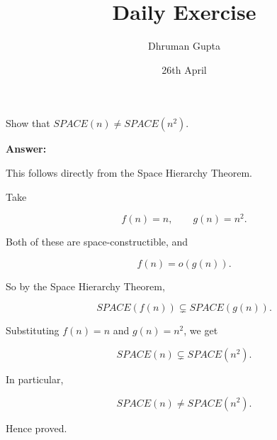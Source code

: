 \documentclass[11pt]{article}
\title{Daily Exercise}
\author{Dhruman Gupta}
\date{26th April}
\begin{document}

Show that $SPACE(n) \neq SPACE(n^2)$.

\textbf{Answer:}

This follows directly from the Space Hierarchy Theorem.

Take

\[
f(n) = n, \qquad g(n) = n^2.
\]

Both of these are space-constructible, and

\[
f(n) = o(g(n)).
\]

So by the Space Hierarchy Theorem,

\[
SPACE(f(n)) \subsetneq SPACE(g(n)).
\]

Substituting $f(n) = n$ and $g(n) = n^2$, we get

\[
SPACE(n) \subsetneq SPACE(n^2).
\]

In particular,

\[
SPACE(n) \neq SPACE(n^2).
\]

Hence proved.
\end{document}
